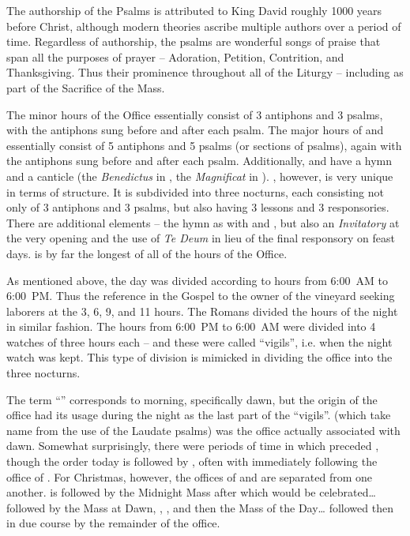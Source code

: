 \documentclass[letterpaper,12pt]{book} %
\begin{document}
{	The authorship of the Psalms is attributed to King David roughly 1000 years before Christ, although modern theories
	ascribe multiple authors over a period of time. Regardless of authorship, the psalms are wonderful songs of praise that
	span all the purposes of prayer – Adoration, Petition, Contrition, and Thanksgiving. Thus their prominence throughout all
	of the Liturgy – including as part of the Sacrifice of the Mass.

	The minor hours of the Office essentially consist of 3 antiphons and 3 psalms, with the antiphons sung before and after
	each psalm. The major hours of \lauds{} and \vespers{} essentially consist of 5 antiphons and 5 psalms (or sections of psalms),
	again with the antiphons sung before and after each psalm. Additionally, \lauds{} and \vespers{} have a hymn and a canticle
	(the \emph{Benedictus} in \lauds{}, the \emph{Magnificat} in \vespers{}). \matins{}, however, is very unique in terms of structure. It is subdivided
	into three nocturns, each consisting not only of 3 antiphons and 3 psalms, but also having 3 lessons and 3 responsories.
	There are additional elements – the hymn as with \lauds{} and \vespers{}, but also an \emph{Invitatory} at the very opening and the
	use of \emph{Te Deum} in lieu of the final responsory on feast days. \matins{} is by far the longest of all of the hours of the Office.

	As mentioned above, the day was divided according to hours from 6:00~AM to 6:00~PM. Thus the reference in the Gospel
	to the owner of the vineyard seeking laborers at the 3\rd{}, 6\th{}, 9\th{}, and 11\th{} hours. The Romans divided the hours of the night
	in similar fashion. The hours from 6:00~PM to 6:00~AM were divided into 4 watches of three hours each – and these were
	called ``vigils'', i.e. when the night watch was kept. This type of division is mimicked in dividing the office into the three
	nocturns.

	The term ``\matins{}'' corresponds to morning, specifically dawn, but the origin of the office had its usage during the night
	as the last part of the ``vigils''. \lauds{} (which take name from the use of the Laudate psalms) was the office actually
	associated with dawn. Somewhat surprisingly, there were periods of time in which \lauds{} preceded \matins{}, though the
	order today is \matins{} followed by \lauds{}, often with \lauds{} immediately following the office of \matins{}. For Christmas,
	however, the offices of \matins{} and \lauds{} are separated from one another. \matins{} is followed by the Midnight Mass after
	which \lauds{} would be celebrated\ldots{} followed by the Mass at Dawn, \prime{}, \terce{}, and then the Mass of the Day\ldots{} followed
	then in due course by the remainder of the office.
}
\end{document}
